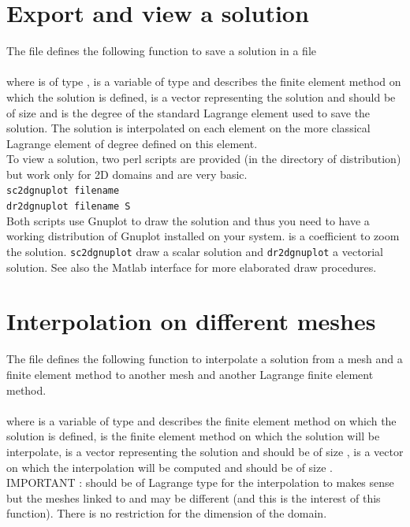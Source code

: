 \documentclass[11pt,a4paper]{article}
\begin{document}
\section{Export and view a solution}

The file  defines the following function to save a solution in a file\\[0.5cm]
\\[0.5cm]
where  is of type ,   is a variable of type  and describes the finite element method on which the solution is defined,  is a vector representing the solution and should be of size  and  is the degree of the standard Lagrange element used to save the solution. The solution is interpolated on each element on the more classical Lagrange element of degree  defined on this element.\\[0.5cm]
To view a solution, two perl scripts are provided (in the directory  of \gf  distribution) but work only for 2D domains and are very basic.\\[0.5cm]
{\tt sc2dgnuplot filename}\\[0.5cm]
{\tt dr2dgnuplot filename S}\\[0.5cm]
Both scripts use Gnuplot to draw the solution and thus you need to have a working distribution of Gnuplot installed on your system.  is a coefficient to zoom the solution. {\tt sc2dgnuplot} draw a scalar solution and {\tt dr2dgnuplot} a vectorial solution. See also the Matlab interface for more elaborated draw procedures.

\section{Interpolation on different meshes}

The file  defines the following function to interpolate a solution from a mesh and a finite element method  to another mesh and another Lagrange finite element method.\\[0.5cm]
\\[0.5cm]
where   is a variable of type  and describes the finite element method on which the solution is defined,  is the finite element method on which the solution will be interpolate,   is a vector representing the solution and should be of size ,  is a vector on which the interpolation will be computed and should be of size . IMPORTANT :  should be of Lagrange type for the interpolation to makes sense but the meshes linked to  and  may be different (and this is the interest of this function). There is no restriction for the dimension of the domain. 
 
\end{document}
